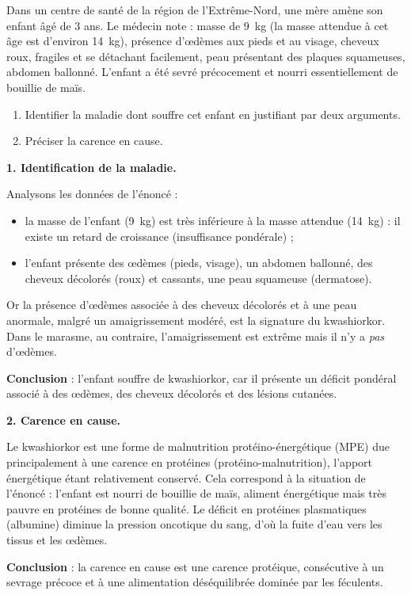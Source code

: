 \documentclass[11pt]{article}
\newcommand{\cle}[1]{{\popxbold\color{popdark}#1}}
\begin{document}
\begin{exoresolu}
Dans un centre de santé de la région de l'Extrême-Nord, une mère amène son enfant âgé de 3 ans. Le médecin note : masse de \SI{9}{kg} (la masse attendue à cet âge est d'environ \SI{14}{kg}), présence d'œdèmes aux pieds et au visage, cheveux roux, fragiles et se détachant facilement, peau présentant des plaques squameuses, abdomen ballonné. L'enfant a été sevré précocement et nourri essentiellement de bouillie de maïs.
\begin{enumerate}
\item Identifier la maladie dont souffre cet enfant en justifiant par deux arguments.
\item Préciser la carence en cause.
\end{enumerate}
\tcblower
\textbf{1. Identification de la maladie.}

Analysons les données de l'énoncé :
\begin{itemize}
\item la masse de l'enfant (\SI{9}{kg}) est très inférieure à la masse attendue (\SI{14}{kg}) : il existe un \cle{retard de croissance} (insuffisance pondérale) ;
\item l'enfant présente des \cle{œdèmes} (pieds, visage), un abdomen ballonné, des cheveux décolorés (roux) et cassants, une peau squameuse (dermatose).
\end{itemize}
Or la présence d'œdèmes associée à des cheveux décolorés et à une peau anormale, malgré un amaigrissement modéré, est la signature du \cle{kwashiorkor}. Dans le marasme, au contraire, l'amaigrissement est extrême mais il n'y a \emph{pas} d'œdèmes.

\textbf{Conclusion} : l'enfant souffre de kwashiorkor, car il présente un déficit pondéral associé à des œdèmes, des cheveux décolorés et des lésions cutanées.

\textbf{2. Carence en cause.}

Le kwashiorkor est une forme de \cle{malnutrition protéino-énergétique} (MPE) due principalement à une \cle{carence en protéines} (protéino-malnutrition), l'apport énergétique étant relativement conservé. Cela correspond à la situation de l'énoncé : l'enfant est nourri de bouillie de maïs, aliment énergétique mais très pauvre en protéines de bonne qualité. Le déficit en protéines plasmatiques (albumine) diminue la pression oncotique du sang, d'où la fuite d'eau vers les tissus et les œdèmes.

\textbf{Conclusion} : la carence en cause est une carence protéique, consécutive à un sevrage précoce et à une alimentation déséquilibrée dominée par les féculents.
\end{exoresolu}
\end{document}
